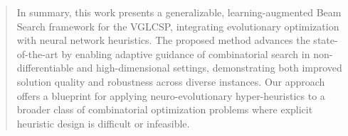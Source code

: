 \documentclass[runningheads]{llncs}
\begin{document}
\begin{abstract}
    	In summary, this work presents a generalizable, learning-augmented Beam Search framework for the VGLCSP, integrating evolutionary optimization with neural network heuristics. The proposed method advances the state-of-the-art by enabling adaptive guidance of combinatorial search in non-differentiable and high-dimensional settings, demonstrating both improved solution quality and robustness across diverse instances. Our approach offers a blueprint for applying neuro-evolutionary hyper-heuristics to a broader class of combinatorial optimization problems where explicit heuristic design is difficult or infeasible.
    \end{abstract}
	
	
	
	
\end{document}
